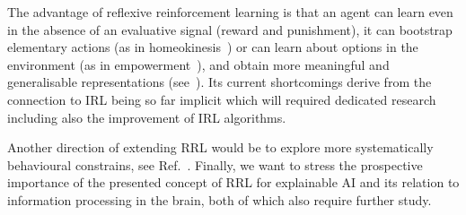 \documentclass{article}
\begin{document}
The advantage of reflexive reinforcement learning is that an agent can learn 
even in the absence of an evaluative signal (reward and punishment), it can 
bootstrap elementary actions (as in homeokinesis~\cite{der2012playful}) or can learn about options in the environment (as in empowerment~\cite{klyubin2005empowerment}),
and obtain more meaningful and generalisable representations (see~\cite{smith2018evaluation}).
Its current shortcomings derive from the connection to IRL being so far implicit which will required dedicated research including also the improvement of IRL algorithms. 

Another direction of extending RRL would be to explore more systematically behavioural constrains, see 
Ref.~\cite{balakrishnan2019incorporating}.
Finally, we want to stress the prospective importance of the presented concept of RRL for 
explainable AI and its relation to information processing in the brain, both of which also require
further study.



\end{document}
